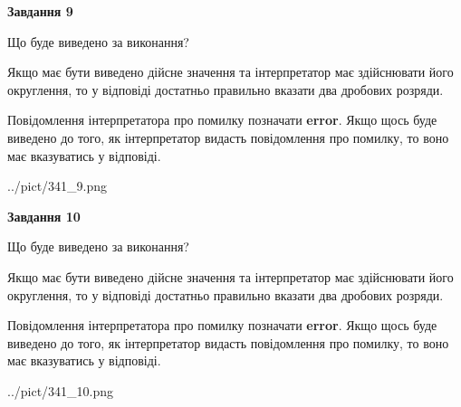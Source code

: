 \documentclass[12pt, ukrainian]{article}
\begin{document}
{\begin {Large}
{\begin {center}\textbf{Завдання 9}\end {center}}\par
Що буде виведено за виконання? \par

Якщо має бути виведено дійсне значення та інтерпретатор має здійснювати його округлення, 
то у відповіді достатньо правильно вказати два дробових розряди.

Повідомлення інтерпретатора про помилку позначати \textbf{error}.
Якщо щось буде виведено до того, як інтерпретатор видасть повідомлення про помилку, 
то воно має вказуватись у відповіді. \par

\begin{center}
	{../pict/341_9.png}
\end{center}
\newpage

{\begin {center}\textbf{Завдання 10}\end {center}}\par
Що буде виведено за виконання? \par

Якщо має бути виведено дійсне значення та інтерпретатор має здійснювати його округлення, 
то у відповіді достатньо правильно вказати два дробових розряди.

Повідомлення інтерпретатора про помилку позначати \textbf{error}.
Якщо щось буде виведено до того, як інтерпретатор видасть повідомлення про помилку, 
то воно має вказуватись у відповіді. \par

\begin{center}
	{../pict/341_10.png}
\end{center}
\newpage

\end {Large}}
\end{document}
